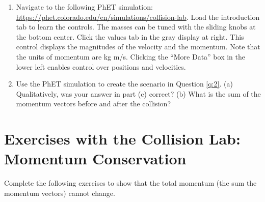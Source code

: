 \documentclass{article}
\begin{document}
\begin{enumerate}
\item Navigate to the following PhET simulation: \url{https://phet.colorado.edu/en/simulations/collision-lab}.  Load the introduction tab to learn the controls.  The masses can be tuned with the sliding knobs at the bottom center.  Click the values tab in the gray display at right.  This control displays the magnitudes of the velocity and the momentum.  Note that the units of momentum are kg m/s.  Clicking the ``More Data'' box in the lower left enables control over positions and velocities.
\item Use the PhET simulation to create the scenario in Question \ref{q:2}. (a) Qualitatively, was your answer in part (c) correct? (b) What is the sum of the momentum vectors before and after the collision?
\end{enumerate}

\clearpage

\section{Exercises with the Collision Lab: Momentum Conservation}

Complete the following exercises to show that the total momentum (the sum the momentum vectors) cannot change.
\end{document}
